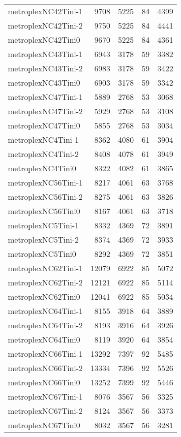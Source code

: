 \begin{longtable}{lrrrr}
metroplexNC42Tini-1 & 9708 & 5225 & 84 & 4399 \\
metroplexNC42Tini-2 & 9750 & 5225 & 84 & 4441 \\
metroplexNC42Tini0 & 9670 & 5225 & 84 & 4361 \\
metroplexNC43Tini-1 & 6943 & 3178 & 59 & 3382 \\
metroplexNC43Tini-2 & 6983 & 3178 & 59 & 3422 \\
metroplexNC43Tini0 & 6903 & 3178 & 59 & 3342 \\
metroplexNC47Tini-1 & 5889 & 2768 & 53 & 3068 \\
metroplexNC47Tini-2 & 5929 & 2768 & 53 & 3108 \\
metroplexNC47Tini0 & 5855 & 2768 & 53 & 3034 \\
metroplexNC4Tini-1 & 8362 & 4080 & 61 & 3904 \\
metroplexNC4Tini-2 & 8408 & 4078 & 61 & 3949 \\
metroplexNC4Tini0 & 8322 & 4082 & 61 & 3865 \\
metroplexNC56Tini-1 & 8217 & 4061 & 63 & 3768 \\
metroplexNC56Tini-2 & 8275 & 4061 & 63 & 3826 \\
metroplexNC56Tini0 & 8167 & 4061 & 63 & 3718 \\
metroplexNC5Tini-1 & 8332 & 4369 & 72 & 3891 \\
metroplexNC5Tini-2 & 8374 & 4369 & 72 & 3933 \\
metroplexNC5Tini0 & 8292 & 4369 & 72 & 3851 \\
metroplexNC62Tini-1 & 12079 & 6922 & 85 & 5072 \\
metroplexNC62Tini-2 & 12121 & 6922 & 85 & 5114 \\
metroplexNC62Tini0 & 12041 & 6922 & 85 & 5034 \\
metroplexNC64Tini-1 & 8155 & 3918 & 64 & 3889 \\
metroplexNC64Tini-2 & 8193 & 3916 & 64 & 3926 \\
metroplexNC64Tini0 & 8119 & 3920 & 64 & 3854 \\
metroplexNC66Tini-1 & 13292 & 7397 & 92 & 5485 \\
metroplexNC66Tini-2 & 13334 & 7396 & 92 & 5526 \\
metroplexNC66Tini0 & 13252 & 7399 & 92 & 5446 \\
metroplexNC67Tini-1 & 8076 & 3567 & 56 & 3325 \\
metroplexNC67Tini-2 & 8124 & 3567 & 56 & 3373 \\
metroplexNC67Tini0 & 8032 & 3567 & 56 & 3281 \\

\end{longtable}

